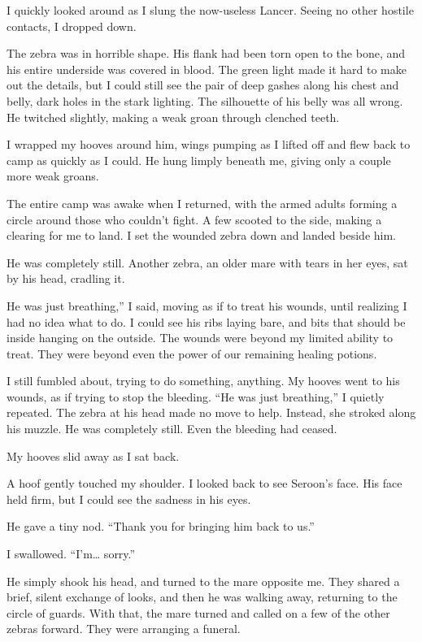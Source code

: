 I quickly looked around as I slung the now-useless Lancer. Seeing no other hostile contacts, I dropped down.

The zebra was in horrible shape. His flank had been torn open to the bone, and his entire underside was covered in blood. The green light made it hard to make out the details, but I could still see the pair of deep gashes along his chest and belly, dark holes in the stark lighting. The silhouette of his belly was all wrong. He twitched slightly, making a weak groan through clenched teeth.

I wrapped my hooves around him, wings pumping as I lifted off and flew back to camp as quickly as I could. He hung limply beneath me, giving only a couple more weak groans.

The entire camp was awake when I returned, with the armed adults forming a circle around those who couldn’t fight. A few scooted to the side, making a clearing for me to land. I set the wounded zebra down and landed beside him.

He was completely still. Another zebra, an older mare with tears in her eyes, sat by his head, cradling it.

\leavevmode{}He was just breathing,” I said, moving as if to treat his wounds, until realizing I had no idea what to do. I could see his ribs laying bare, and bits that should be inside hanging on the outside. The wounds were beyond my limited ability to treat. They were beyond even the power of our remaining healing potions.

I still fumbled about, trying to do something, anything. My hooves went to his wounds, as if trying to stop the bleeding. “He was just breathing,” I quietly repeated. The zebra at his head made no move to help. Instead, she stroked along his muzzle. He was completely still. Even the bleeding had ceased.

My hooves slid away as I sat back.

A hoof gently touched my shoulder. I looked back to see Seroon’s face. His face held firm, but I could see the sadness in his eyes.

He gave a tiny nod. “Thank you for bringing him back to us.”

I swallowed. “I’m… sorry.”

He simply shook his head, and turned to the mare opposite me. They shared a brief, silent exchange of looks, and then he was walking away, returning to the circle of guards. With that, the mare turned and called on a few of the other zebras forward. They were arranging a funeral.

